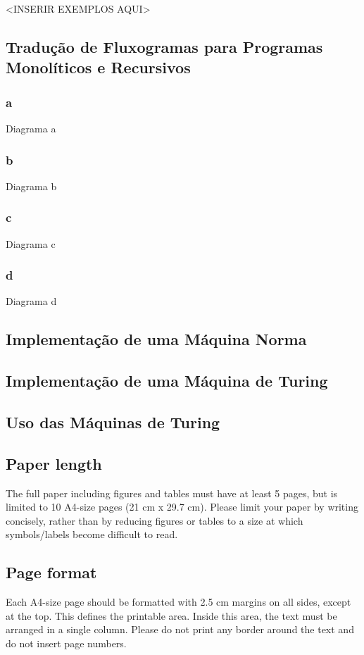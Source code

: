 \documentclass[12pt,fleqn]{article}
\begin{document}
<INSERIR EXEMPLOS AQUI>

\subsection{Tradução de Fluxogramas para Programas Monolíticos e Recursivos}

\subsubsection{a}
Diagrama a

\subsubsection{b}
Diagrama b

\subsubsection{c}
Diagrama c

\subsubsection{d}
Diagrama d

\subsection{Implementação de uma Máquina Norma}

\subsection{Implementação de uma Máquina de Turing}

\subsection{Uso das Máquinas de Turing}


\subsection{Paper length} The full paper including figures and tables must have
at least 5 pages, but is limited to 10 A4-size pages (21 cm x 29.7 cm). Please
limit your paper by writing concisely, rather than by reducing figures or tables
to a size at which symbols/labels become difficult to read.

\subsection{Page format}
Each A4-size page should be formatted with 2.5 cm margins on all sides, except
at the top. This defines the printable area. Inside this area, the text must be
arranged in a single column. Please do not print any border around the text and
do not insert page numbers.
\end{document}
